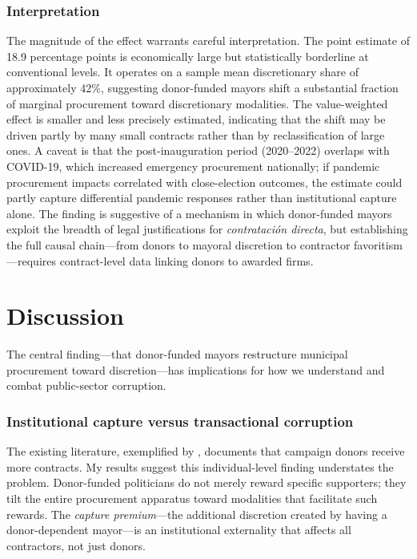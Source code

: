 \documentclass[12pt]{article}
\begin{document}


\subsubsection*{Interpretation} The magnitude of the effect warrants careful interpretation. The point estimate of 18.9 percentage points is economically large but statistically borderline at conventional levels. It operates on a sample mean discretionary share of approximately 42\%, suggesting donor-funded mayors shift a substantial fraction of marginal procurement toward discretionary modalities. The value-weighted effect is smaller and less precisely estimated, indicating that the shift may be driven partly by many small contracts rather than by reclassification of large ones. A caveat is that the post-inauguration period (2020--2022) overlaps with COVID-19, which increased emergency procurement nationally; if pandemic procurement impacts correlated with close-election outcomes, the estimate could partly capture differential pandemic responses rather than institutional capture alone. The finding is suggestive of a mechanism in which donor-funded mayors exploit the breadth of legal justifications for \textit{contrataci\'{o}n directa}, but establishing the full causal chain---from donors to mayoral discretion to contractor favoritism---requires contract-level data linking donors to awarded firms.


\section{Discussion}
\label{sec:discussion}

The central finding---that donor-funded mayors restructure municipal procurement toward discretion---has implications for how we understand and combat public-sector corruption.

\subsubsection*{Institutional capture versus transactional corruption} The existing literature, exemplified by \citet{gulzar2022procurement}, documents that campaign donors receive more contracts. My results suggest this individual-level finding understates the problem. Donor-funded politicians do not merely reward specific supporters; they tilt the entire procurement apparatus toward modalities that facilitate such rewards. The \textit{capture premium}---the additional discretion created by having a donor-dependent mayor---is an institutional externality that affects all contractors, not just donors.
\end{document}
